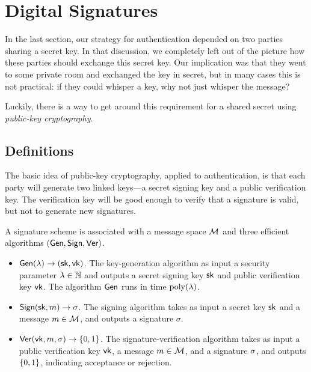 \chapter{Digital Signatures}

In the last section, our strategy for
authentication depended on two parties sharing a
secret key.
In that discussion, we completely left
out of the picture how these parties should
exchange this secret key.
Our implication was that they
went to some private room and exchanged the key in
secret, but in many cases this is not practical:
if they could whisper a key, why not just whisper the message?

Luckily, there is a way to get around this requirement for a shared secret using \emph{public-key cryptography}.\autocite{DH76} %

\section{Definitions}
The basic idea of public-key cryptography, applied
to authentication, is that each party will
generate two linked keys---a secret signing key
and a public verification key.
The verification key will be good enough to verify that a signature
is valid, but not to generate new signatures.

\begin{definition}
	A signature scheme is associated with a message space $\mathcal{M}$ and three efficient algorithms $(\mathsf{Gen}, \mathsf{Sign}, \mathsf{Ver})$.

	\begin{itemize}
    \item $\mathsf{Gen}(\lambda) \to ({\mathsf{sk}}, \mathsf{vk})$.
      The key-generation algorithm as input a security parameter $\lambda \in \mathbb{N}$ and outputs a secret signing key ${\mathsf{sk}}$ and public verification key $\mathsf{vk}$.
      The algorithm $\mathsf{Gen}$ runs in time $\operatorname{poly}(\lambda)$.
    \item $\mathsf{Sign}({\mathsf{sk}}, m) \to \sigma$.
      The signing algorithm takes as input a secret key ${\mathsf{sk}}$ and a message $m \in \mathcal{M}$, and outputs a signature $\sigma$.
    \item $\mathsf{Ver}(\mathsf{vk}, m, \sigma) \to \{0,1\}$.
      The signature-verification algorithm takes as input a public verification key $\mathsf{vk}$, a message $m \in \mathcal{M}$, and a signature $\sigma$, 
      and outputs $\{0,1\}$, indicating acceptance or rejection.
	\end{itemize}
	
\end{definition}

